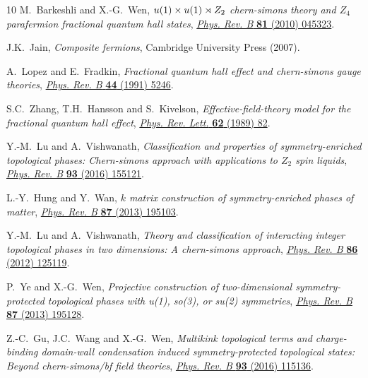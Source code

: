 \documentclass[11pt,nofootinbib,preprint]{revtex4-1}
\begin{document}
\begin{thebibliography}{10}
M.~Barkeshli and X.-G.~Wen,
  \emph{$u(1)\ifmmode\times\else\texttimes\fi{}u(1)\ensuremath{\rtimes}{Z}_{2}$
  chern-simons theory and ${Z}_{4}$ parafermion fractional quantum hall
  states}, \href{https://doi.org/10.1103/PhysRevB.81.045323}{\emph{Phys. Rev.
  B} {\bfseries 81} (2010) 045323}.

J.K.~Jain, \emph{Composite fermions}, Cambridge University Press (2007).

A.~Lopez and E.~Fradkin, \emph{Fractional quantum hall effect and chern-simons
  gauge theories}, \href{https://doi.org/10.1103/PhysRevB.44.5246}{\emph{Phys.
  Rev. B} {\bfseries 44} (1991) 5246}.

S.C.~Zhang, T.H.~Hansson and S.~Kivelson, \emph{Effective-field-theory model
  for the fractional quantum hall effect},
  \href{https://doi.org/10.1103/PhysRevLett.62.82}{\emph{Phys. Rev. Lett.}
  {\bfseries 62} (1989) 82}.

Y.-M.~Lu and A.~Vishwanath, \emph{Classification and properties of
  symmetry-enriched topological phases: Chern-simons approach with applications
  to ${Z}_{2}$ spin liquids},
  \href{https://doi.org/10.1103/PhysRevB.93.155121}{\emph{Phys. Rev. B}
  {\bfseries 93} (2016) 155121}.

L.-Y.~Hung and Y.~Wan, \emph{$k$ matrix construction of symmetry-enriched
  phases of matter},
  \href{https://doi.org/10.1103/PhysRevB.87.195103}{\emph{Phys. Rev. B}
  {\bfseries 87} (2013) 195103}.

Y.-M.~Lu and A.~Vishwanath, \emph{Theory and classification of interacting
  integer topological phases in two dimensions: A chern-simons approach},
  \href{https://doi.org/10.1103/PhysRevB.86.125119}{\emph{Phys. Rev. B}
  {\bfseries 86} (2012) 125119}.

P.~Ye and X.-G.~Wen, \emph{Projective construction of two-dimensional
  symmetry-protected topological phases with u(1), so(3), or su(2) symmetries},
  \href{https://doi.org/10.1103/PhysRevB.87.195128}{\emph{Phys. Rev. B}
  {\bfseries 87} (2013) 195128}.

Z.-C.~Gu, J.C.~Wang and X.-G.~Wen, \emph{Multikink topological terms and
  charge-binding domain-wall condensation induced symmetry-protected
  topological states: Beyond chern-simons/bf field theories},
  \href{https://doi.org/10.1103/PhysRevB.93.115136}{\emph{Phys. Rev. B}
  {\bfseries 93} (2016) 115136}.


\end{thebibliography}
\end{document}

